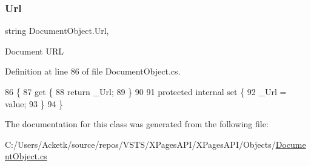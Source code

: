 \subsubsection{\texorpdfstring{Url}{Url}}
{\footnotesize\ttfamily string Document\+Object.\+Url\hspace{0.3cm}{\ttfamily [get]}, {\ttfamily [set]}}



Document U\+RL 



Definition at line 86 of file Document\+Object.\+cs.


\begin{DoxyCode}
86                       \{
87         \textcolor{keyword}{get} \{
88             \textcolor{keywordflow}{return} \_Url;
89         \}
90 
91         \textcolor{keyword}{protected} \textcolor{keyword}{internal} \textcolor{keyword}{set} \{
92             \_Url = value;
93         \}
94     \}
\end{DoxyCode}


The documentation for this class was generated from the following file\+:\begin{DoxyCompactItemize}
\item 
C\+:/\+Users/\+Acketk/source/repos/\+V\+S\+T\+S/\+X\+Pages\+A\+P\+I/\+X\+Pages\+A\+P\+I/\+Objects/\mbox{\hyperlink{_document_object_8cs}{Document\+Object.\+cs}}\end{DoxyCompactItemize}
